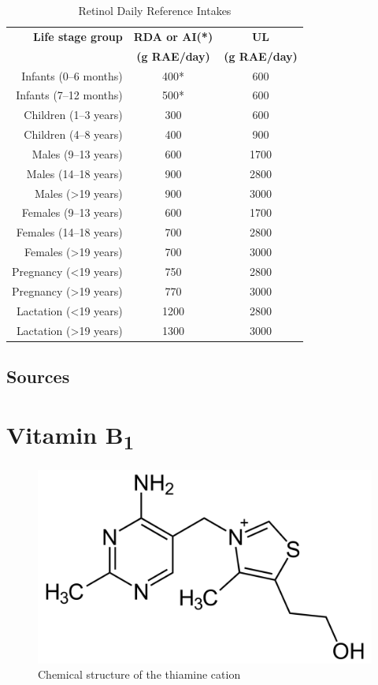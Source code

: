 \documentclass{book}
\begin{document}
\begin{sloppypar}
\begin{table}[ht]
	\caption{Retinol Daily Reference Intakes}
	\centering \begin{tabular}{| r | c | c |}
		\hline
		\textbf{Life stage group} & \textbf{RDA or AI(*)} & \textbf{UL}\\
		& \textbf{(\textmu g RAE/day)} & \textbf{(\textmu g RAE/day)}\\ \hline
		Infants (0--6 months) & 400* & 600\\ \hline
		Infants (7--12 months) & 500* & 600\\ \hline
		Children (1--3 years) & 300 & 600\\ \hline
		Children (4--8 years) & 400 & 900\\ \hline
		Males (9--13 years) & 600 & 1700\\ \hline
		Males (14--18 years) & 900 & 2800\\ \hline
		Males (\textgreater19 years) & 900 & 3000\\ \hline
		Females (9--13 years) & 600 & 1700\\ \hline
		Females (14--18 years) & 700 & 2800\\ \hline
		Females (\textgreater19 years) & 700 & 3000\\ \hline
		Pregnancy (\textless19 years) & 750 & 2800\\ \hline
		Pregnancy (\textgreater19 years) & 770 & 3000\\ \hline
		Lactation (\textless19 years) & 1200 & 2800\\ \hline
		Lactation (\textgreater19 years) & 1300 & 3000\\ \hline
	\end{tabular}
\end{table}
\newpage

\section{Sources}


\chapter{Vitamin B\texorpdfstring{\textsubscript{1}}{1}}
\begin{figure}[h]
	\caption{Chemical structure of  the thiamine cation}
	\centering \includegraphics[width=\textwidth]{images/Vitamin_B1_chemical_structure}
\end{figure}
\newpage


\end{sloppypar}
\end{document}
